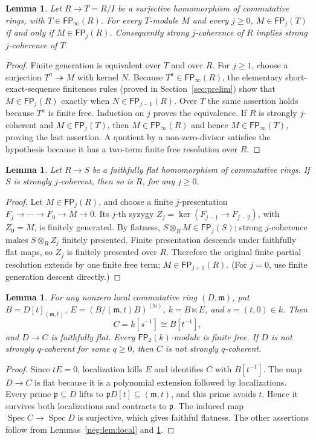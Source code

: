 \documentclass[11pt]{article}
\numberwithin{equation}{section}
\newtheorem{lemma}[theorem]{Lemma}
\theoremstyle{definition}
\theoremstyle{remark}
\newcommand{\FP}{\mathsf{FP}}
\begin{document}
\begin{lemma}\label{neg:lem:quotient}
Let $R\to T=R/I$ be a surjective homomorphism of commutative rings,
with $T\in\FP_\infty(R)$.  For every $T$-module $M$ and every $j\ge0$,
$M\in\FP_j(T)$ if and only if $M\in\FP_j(R)$.
Consequently strong $j$-coherence of $R$ implies strong $j$-coherence
of $T$.
\end{lemma}
\begin{proof}
Finite generation is equivalent over $T$ and over $R$.
For $j\ge1$, choose a surjection $T^a\twoheadrightarrow M$ with kernel
$N$.  Because $T^a\in\FP_\infty(R)$, the elementary short-exact-sequence
finiteness rules (proved in Section~\ref{sec:prelim}) show that
$M\in\FP_j(R)$ exactly when $N\in\FP_{j-1}(R)$.
Over $T$ the same assertion holds because $T^a$ is finite free.
Induction on $j$ proves the equivalence.
If $R$ is strongly $j$-coherent and $M\in\FP_j(T)$, then
$M\in\FP_\infty(R)$ and hence $M\in\FP_\infty(T)$, proving the last
assertion.  A quotient by a non-zero-divisor satisfies the hypothesis
because it has a two-term finite free resolution over $R$.
\end{proof}

\begin{lemma}\label{neg:lem:descent}
Let $R\to S$ be a faithfully flat homomorphism of commutative rings.
If $S$ is strongly $j$-coherent, then so is $R$, for any $j\ge0$.
\end{lemma}
\begin{proof}
Let $M\in\FP_j(R)$, and choose a finite $j$-presentation
$F_j\to\cdots\to F_0\to M\to0$.  Its $j$-th syzygy
$Z_j=\ker(F_{j-1}\to F_{j-2})$, with $Z_0=M$, is finitely generated.
By flatness, $S\otimes_RM\in\FP_j(S)$; strong $j$-coherence makes
$S\otimes_RZ_j$ finitely presented.  Finite presentation descends under
faithfully flat maps, so $Z_j$ is finitely presented over $R$.
Therefore the original finite partial resolution extends by one finite
free term; $M\in\FP_{j+1}(R)$.  (For $j=0$, use finite generation
descent directly.)
\end{proof}

\begin{lemma}\label{neg:lem:realization}
For any nonzero local commutative ring $(D,\mathfrak m)$, put
$B=D[t]_{(\mathfrak m,t)}$, $E=(B/(\mathfrak m,t)B)^{(\mathbb N)}$,
$k=B\ltimes E$, and $s=(t,0)\in k$.  Then
\[
C=k[s^{-1}]\cong B[t^{-1}],
\]
and $D\to C$ is faithfully flat.  Every $\FP_2(k)$-module is finite
free.  If $D$ is not strongly $q$-coherent for some $q\ge0$, then
$C$ is not strongly $q$-coherent.
\end{lemma}
\begin{proof}
Since $tE=0$, localization kills $E$ and identifies $C$ with
$B[t^{-1}]$.  The map $D\to C$ is flat because it is a polynomial
extension followed by localizations.  Every prime
$\mathfrak p\subseteq D$ lifts to
$\mathfrak pD[t]\subseteq(\mathfrak m,t)$, and this prime avoids $t$.
Hence it survives both localizations and contracts to $\mathfrak p$.
The induced map $\operatorname{Spec}C\to\operatorname{Spec}D$ is
surjective, which gives faithful flatness.
The other assertions follow from Lemmas~\ref{neg:lem:local} and
\ref{neg:lem:descent}.
\end{proof}
\end{document}
